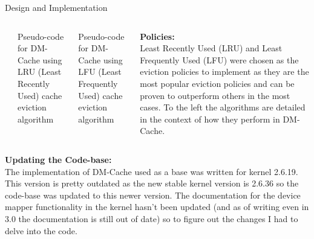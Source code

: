 \documentclass[final,12pt]{beamer}
\begin{document}
\begin{frame}{}
\begin{columns}
  \end{columns}

  \begin{block}{\large Design and Implementation}

    \begin{columns}

      \begin{column}{.01\textwidth}
      \end{column}

      \begin{column}{.33\textwidth}
        

        \centering \small Pseudo-code for DM-Cache using LRU (Least Recently
        Used) cache eviction algorithm
      \end{column}

      \begin{column}{.33\textwidth}
        

        \centering \small Pseudo-code for DM-Cache using LFU (Least Frequently
        Used) cache eviction algorithm
      \end{column}

      \begin{column}{.33\textwidth}

        \textbf{Policies:} \\

        Least Recently Used (LRU) and Least Frequently Used (LFU) were chosen as
        the eviction policies to implement as they are the most popular eviction
        policies and can be proven to outperform others in the most cases. To
        the left the algorithms are detailed in the context of how they perform
        in DM-Cache.

      \end{column}

    \end{columns}

    \textbf{Updating the Code-base:} \\

    The implementation of DM-Cache used as a base was written for kernel
    2.6.19. This version is pretty outdated as the new stable kernel version is
    2.6.36 so the code-base was updated to this newer version. The documentation
    for the device mapper functionality in the kernel hasn't been updated (and
    as of writing even in 3.0 the documentation is still out of date) so to
    figure out the changes I had to delve into the code.


\end{block}
\end{frame}
\end{document}
